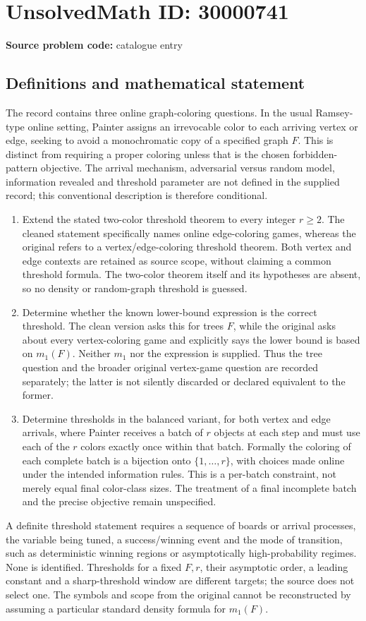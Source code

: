\documentclass[11pt]{article}
\begin{document}
\section*{UnsolvedMath ID: 30000741}
\textbf{Source problem code:} catalogue entry
\subsection{Definitions and mathematical statement}
The record contains three online graph-coloring questions. In the usual Ramsey-type online setting, Painter assigns an irrevocable color to each arriving vertex or edge, seeking to avoid a monochromatic copy of a specified graph \(F\). This is distinct from requiring a proper coloring unless that is the chosen forbidden-pattern objective. The arrival mechanism, adversarial versus random model, information revealed and threshold parameter are not defined in the supplied record; this conventional description is therefore conditional.
\begin{enumerate}
\item Extend the stated two-color threshold theorem to every integer \(r\geq2\). The cleaned statement specifically names online edge-coloring games, whereas the original refers to a vertex/edge-coloring threshold theorem. Both vertex and edge contexts are retained as source scope, without claiming a common threshold formula. The two-color theorem itself and its hypotheses are absent, so no density or random-graph threshold is guessed.
\item Determine whether the known lower-bound expression is the correct threshold. The clean version asks this for trees \(F\), while the original asks about every vertex-coloring game and explicitly says the lower bound is based on \(m_1(F)\). Neither \(m_1\) nor the expression is supplied. Thus the tree question and the broader original vertex-game question are recorded separately; the latter is not silently discarded or declared equivalent to the former.
\item Determine thresholds in the balanced variant, for both vertex and edge arrivals, where Painter receives a batch of \(r\) objects at each step and must use each of the \(r\) colors exactly once within that batch. Formally the coloring of each complete batch is a bijection onto \(\{1,\ldots,r\}\), with choices made online under the intended information rules. This is a per-batch constraint, not merely equal final color-class sizes. The treatment of a final incomplete batch and the precise objective remain unspecified.
\end{enumerate}
A definite threshold statement requires a sequence of boards or arrival processes, the variable being tuned, a success/winning event and the mode of transition, such as deterministic winning regions or asymptotically high-probability regimes. None is identified. Thresholds for a fixed \(F,r\), their asymptotic order, a leading constant and a sharp-threshold window are different targets; the source does not select one. The symbols and scope from the original cannot be reconstructed by assuming a particular standard density formula for \(m_1(F)\).
\end{document}
